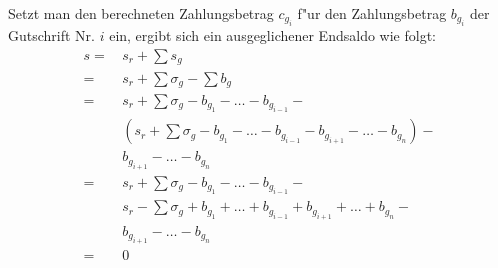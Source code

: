 \documentclass[a4paper]{article}
\numberwithin{equation}{section}
\begin{document}
Setzt man den berechneten Zahlungsbetrag $c_{g_i}$ f"ur den Zahlungsbetrag
$b_{g_i}$ der Gutschrift Nr. $i$ ein, ergibt sich ein ausgeglichener Endsaldo
wie folgt:
\begin{equation}
\begin{split}
  s = & \,s_r + \sum s_g \\
    = & \,s_r + \sum \sigma_g - \sum b_g \\
    = & \,s_r + \sum \sigma_g - b_{g_1} - \ldots - b_{g_{i-1}} - \\
      & \,(s_r + \sum \sigma_g - b_{g_1} - \ldots - b_{g_{i-1}} - b_{g_{i+1}} - 
      \ldots - b_{g_n}) - \\
      & \,b_{g_{i+1}} - \ldots - b_{g_n} \\
    = & \,s_r + \sum \sigma_g - b_{g_1} - \ldots - b_{g_{i-1}} - \\
      & \,s_r - \sum \sigma_g + b_{g_1} + \ldots + b_{g_{i-1}} + b_{g_{i+1}} + 
      \ldots + b_{g_n} - \\
      & \,b_{g_{i+1}} - \ldots - b_{g_n} \\
    = & \,0
\end{split}
\end{equation}
\end{document}
